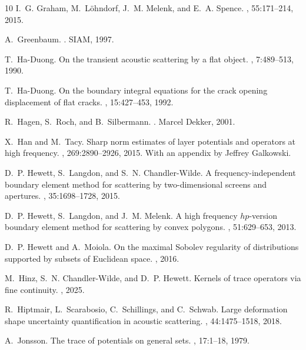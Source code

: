 \documentclass{birkjour}
\theoremstyle{definition}
\theoremstyle{remark}
\numberwithin{equation}{section}
\begin{document}
\begin{thebibliography}{10}
I.~G. Graham, M.~L\"{o}hndorf, J.~M. Melenk, and E.~A. Spence.
, 55:171--214, 2015.

A.~Greenbaum.
.
\newblock SIAM, 1997.

T.~Ha-Duong.
\newblock On the transient acoustic scattering by a flat object.
, 7:489--513, 1990.

T.~Ha-Duong.
\newblock On the boundary integral equations for the crack opening displacement
  of flat cracks.
, 15:427--453, 1992.

R.~Hagen, S.~Roch, and B.~Silbermann.
.
\newblock Marcel Dekker, 2001.

X.~Han and M.~Tacy.
\newblock Sharp norm estimates of layer potentials and operators at high
  frequency.
, 269:2890--2926, 2015.
\newblock With an appendix by Jeffrey Galkowski.

D.~P. Hewett, S.~Langdon, and S.~N. Chandler-Wilde.
\newblock A frequency-independent boundary element method for scattering by
  two-dimensional screens and apertures.
, 35:1698--1728, 2015.

D.~P. Hewett, S.~Langdon, and J.~M. Melenk.
\newblock A high frequency $hp$-version boundary element method for scattering
  by convex polygons.
, 51:629--653, 2013.

D.~P. Hewett and A.~Moiola.
\newblock On the maximal {S}obolev regularity of distributions supported by
  subsets of {E}uclidean space.
, 2016.

M.~Hinz, S.~N. Chandler-Wilde, and D.~P. Hewett.
\newblock Kernels of trace operators via fine continuity.
, 2025.

R.~Hiptmair, L.~Scarabosio, C.~Schillings, and C.~Schwab.
\newblock Large deformation shape uncertainty quantification in acoustic
  scattering.
, 44:1475--1518, 2018.

A.~Jonsson.
\newblock The trace of potentials on general sets.
, 17:1--18, 1979.


\end{thebibliography}
\end{document}

